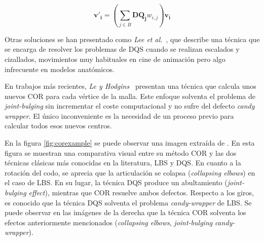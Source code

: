 \begin{equation}
\label{eqn:DQS}
\mathbf{v'_{i}} = (\sum_{j \in B} \mathbf{DQ_{j}}w_{i,j}) \mathbf{v_{i}}
\end{equation}

Otras soluciones se han presentado como \emph{Lee et al.}~\cite{Lee2013}, que describe una técnica que se encarga de resolver los problemas de \ac{DQS} cuando se realizan escalados y cizallados, movimientos muy habituales en cine de animación pero algo infrecuente en modelos anatómicos.

En trabajos más recientes, \emph{Le y Hodgins}~\cite{le2016real} presentan una técnica que calcula unos nuevos \ac{COR} para cada vértice de la malla. Este enfoque solventa el problema de \emph{joint-bulging} sin incrementar el coste computacional y no sufre del defecto \emph{candy wrapper}. El único inconveniente es la necesidad de un proceso previo para calcular todos esos nuevos centros.

En la figura \ref{fig:corexample} se puede observar una imagen extraída de \cite{le2016real}. En esta figura se muestran  una comparativa visual entre su método \ac{COR} y las dos técnicas clásicas más conocidas en la literatura, \ac{LBS} y \ac{DQS}. En cuanto a la rotación del codo, se aprecia que la articulación se colapsa (\emph{collapsing elbows}) en el caso de \ac{LBS}. En su lugar, la técnica \ac{DQS} produce un abultamiento (\emph{joint-bulging effect}), mientras que \ac{COR} resuelve ambos defectos. Respecto a los giros, es conocido que la técnica \ac{DQS} solventa el problema \emph{candy-wrapper} de \ac{LBS}. Se puede observar en las imágenes de la derecha que la técnica \ac{COR} solventa los efectos anteriormente mencionados (\emph{collapsing elbows}, \emph{joint-bulging} \emph{candy-wrapper}). 


